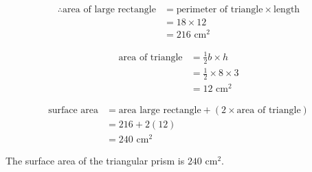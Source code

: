 \begin{wex}
{\begin{align*}
  \therefore \mbox{area of large rectangle}
  &= \mbox{perimeter of triangle} \times \mbox{length}\\
  &= 18 \times 12 \\
  &= 216 \mbox{ cm}^2
\end{align*}

\begin{align*}
  \mbox{area of triangle} &= \frac{1}{2}b \times h\\
  &= \frac{1}{2} \times 8 \times 3\\
  &= 12 \mbox{ cm}^2
\end{align*}


\begin{align*}
  \mbox{surface area}
  &= \mbox{area large rectangle} + (2 \times \mbox{area of triangle}) \\
  &= 216 + 2(12) \\
  &= 240\mbox{ cm}^2
\end{align*}

The surface area of the triangular prism is $240$ cm$^2$.
}
\end{wex}


